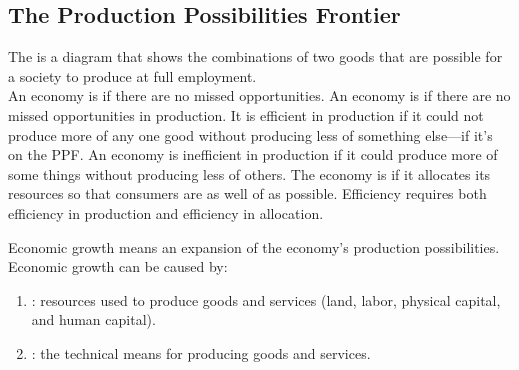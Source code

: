\documentclass{article}
\begin{document}
\subsection{The Production Possibilities Frontier}

The  is a diagram that shows the combinations of two goods that are possible for a society to produce at full employment. \\ 

An economy is  if there are no missed opportunities. An economy is  if there are no missed opportunities in production. It is efficient in production if it could not produce more of any one good without producing less of something else---if it's on the PPF. An economy is inefficient in production if it could produce more of some things without producing less of others. The economy is  if it allocates its resources so that consumers are as well of as possible. Efficiency requires both efficiency in production and efficiency in allocation. 

Economic growth means an expansion of the economy's production possibilities. Economic growth can be caused by: 
\begin{enumerate}
  \item {}: resources used to produce goods and services (land, labor, physical capital, and human capital). 
  \item {}: the technical means for producing goods and services. 
\end{enumerate}
\end{document}
